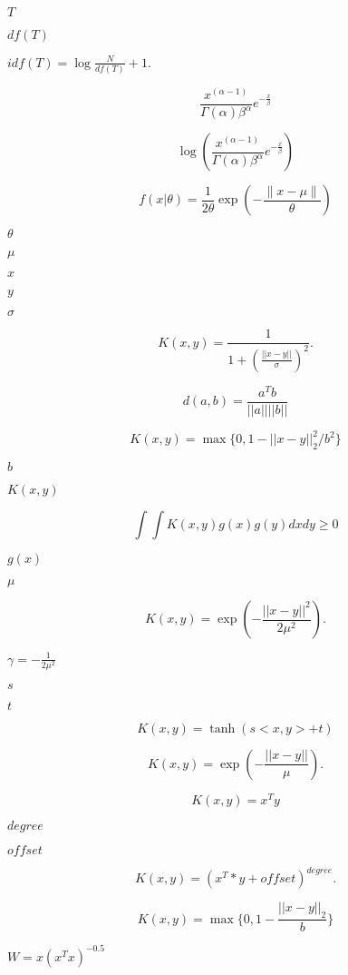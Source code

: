 \documentclass{article}
\begin{document}
$ T $
\pagebreak

$ df(T) $
\pagebreak

$ idf(T) = \log \frac{N}{df(T)} + 1. $
\pagebreak

\[ \frac{x^{(\alpha - 1)}}{\Gamma(\alpha) \beta^\alpha} e^{-\frac{x}{\beta}} \]
\pagebreak

\[ \log(\frac{x^{(\alpha - 1)}}{\Gamma(\alpha) \beta^\alpha} e^ {-\frac{x}{\beta}}) \]
\pagebreak

\[ f(x|\theta) = \frac{1}{2 \theta}\exp\left(-\frac{\|x - \mu\|}{\theta}\right) \]
\pagebreak

$\theta$
\pagebreak

$\mu$
\pagebreak

$ x $
\pagebreak

$ y $
\pagebreak

$ \sigma $
\pagebreak

\[ K(x, y) = \frac{1}{1 + (\frac{|| x - y ||}{\sigma})^2}. \]
\pagebreak

\[ d(a, b) = \frac{a^T b}{|| a || || b ||} \]
\pagebreak

\[ K(x, y) = \max \{0, 1 - || x - y ||^2_2 / b^2 \} \]
\pagebreak

$ b $
\pagebreak

$ K(x, y) $
\pagebreak

\[ \int \int K(x, y) g(x) g(y) dx dy \ge 0 \]
\pagebreak

$ g(x) $
\pagebreak

$ \mu $
\pagebreak

\[ K(x, y) = \exp(-\frac{|| x - y ||^2}{2 \mu^2}). \]
\pagebreak

$ \gamma = -\frac{1}{2 \mu^2} $
\pagebreak

$ s $
\pagebreak

$ t $
\pagebreak

\[ K(x, y) = \tanh(s <x, y> + t) \]
\pagebreak

\[ K(x, y) = \exp(-\frac{|| x - y ||}{\mu}). \]
\pagebreak

\[ K(x, y) = x^T y \]
\pagebreak

$ degree $
\pagebreak

$ offset $
\pagebreak

\[ K(x, y) = (x^T * y + offset) ^ {degree}. \]
\pagebreak

\[ K(x, y) = \max \{ 0, 1 - \frac{|| x - y ||_2}{b} \} \]
\pagebreak

$ W = x (x^T x)^{-0.5} $
\pagebreak
\end{document}
